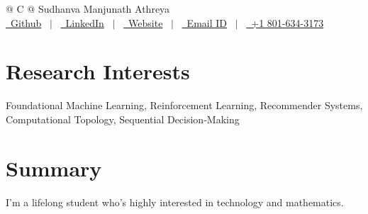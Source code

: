 \documentclass[a4paper, 11pt]{article}
\begin{document}
	
	\pagestyle{empty} 
	
	
	
	\begin{tabularx}{\linewidth}{@{} C @{}}
		\Huge{Sudhanva Manjunath Athreya} \\[7.5pt]
		\href{https://github.com/FoxHound0x00}{\raisebox{-0.05\height}\faGithub\ Github} \ $|$ \ 
		\href{https://www.linkedin.com/in/athreya32262/}{\raisebox{-0.05\height}\faLinkedin\ LinkedIn} \ $|$ \ 
		\href{https://foxhound0x00.github.io/}{\raisebox{-0.05\height}\faGlobe \ Website} \ $|$ \ 
		\href{mailto:u1529299@hotmail.com}{\raisebox{-0.05\height}\faEnvelope \ Email ID} \ $|$ \ 
		\href{tel:+91 910-817-1918}{\raisebox{-0.05\height}\faMobile \ +1 801-634-3173} \\
	\end{tabularx}
	
	
	\section{Research Interests}

	Foundational Machine Learning, Reinforcement Learning, Recommender Systems, Computational Topology, Sequential Decision-Making 
	
	\section{Summary}
	I'm a lifelong student who's highly interested in technology and mathematics.
\end{document}
